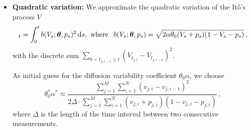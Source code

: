 \documentclass[11pt]{article}
\theoremstyle{definition}
\begin{document}
\begin{itemize}
\item \textbf{Quadratic variation:}  We approximate the quadratic variation of the  It\^{o}'s  process $V$
\begin{equation*}
[V]_t=\int_0^t b(V_s; \bm{\theta}, p_s)^2 \dif s, \text{ where }  \:\: b(V_s; \bm{\theta}, p_s) = 
\sqrt{2 \alpha \theta_0 (V_s +p_s ) (1-V_s - p_s)}\,,
\end{equation*}
with the discrete sum $\sum_{0< t_{j, i-1} \leq t}\left(V_{t_{j, i}} - V_{t_{j, i-1}}\right)^2$.

As initial guess for the diffusion variability coefficient $\theta_0 \alpha$, we choose
\begin{equation}
\theta_0^*\alpha^*\approx\frac{\sum_{j=1}^M\sum_{i=1}^N(v_{j,i} - v_{j,i-1})^2}{2\Delta\cdot\sum_{j=1}^M\sum_{i=1}^N(v_{j,i}+p_{j,i})(1-v_{j,i}-p_{j,i})}\,,
\label{Eq-2}
\end{equation}
where $\Delta$ is the length of the time interval between two consecutive measurements.
\end{itemize}

%
\end{document}
